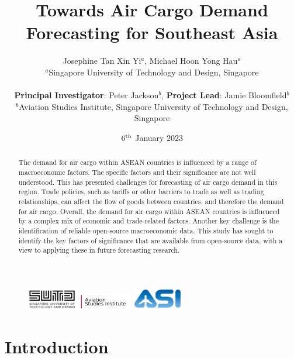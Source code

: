 \documentclass{article}
\title{Towards Air Cargo Demand Forecasting for Southeast Asia}
\author{Josephine Tan Xin Yi$^{a}$, Michael Hoon Yong Hau$^{a}$\\
        \small $^{a}$Singapore University of Technology and Design, Singapore \\\\
        \small \textbf{Principal Investigator}: Peter Jackson$^{b}$, \textbf{Project Lead}: Jamie Bloomfield$^{b}$ \\
        \small $^{b}$Aviation Studies Institute, Singapore University of Technology and Design, Singapore \\
}
\date{$6\textsuperscript{th}$ January $2023$} %
\begin{document}
\maketitle

\begin{figure}[t!]
    \centering
    \includegraphics[width=0.2\textwidth]{images/ASI Graphics/sutd-asi-logo-web-2021-fc.png}
    \includegraphics[width=0.2\textwidth]{images/ASI Graphics/asi-logo-web-2022-fc.png}
    \includegraphics[width=0.2\textwidth]{images/ASI Graphics/asi-logo-web-2021-fc-02-v2.png}
    \label{titlefig}
\end{figure}

\begin{abstract} 
\noindent The demand for air cargo within ASEAN countries is influenced by a range of macroeconomic factors. The specific factors and their significance are not well understood. This has presented challenges for forecasting of air cargo demand in this region. Trade policies, such as tariffs or other barriers to trade as well as trading relationships, can affect the flow of goods between countries, and therefore the demand for air cargo. Overall, the demand for air cargo within ASEAN countries is influenced by a complex mix of economic and trade-related factors. Another key challenge is the identification of reliable open-source macroeconomic data. This study has sought to identify the key factors of significance that are available from open-source data, with a view to applying these in future forecasting research.
\end{abstract}

\noindent{}

\newpage

\tableofcontents

\newpage

\section{Introduction}
\end{document}
